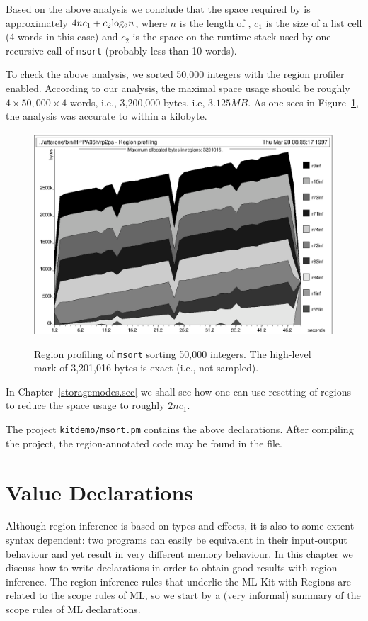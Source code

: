 \documentclass[12pt]{book}
\begin{document}
Based on the above analysis we conclude that the space required by
 is approximately $4nc_1+c_2{\rm log}_2n$, where $n$ is 
the length of , $c_1$ is the size of a list cell (4 words in this
case) and $c_2$ is the space on the runtime stack used by one recursive call
of {\tt msort} (probably less than 10 words). 

To check the above analysis, we sorted 50,000 integers with the region profiler
enabled. According to our
analysis, the maximal space usage should be roughly $4\times 50,000 \times 4$
words, i.e., 3,200,000 bytes, i.e,  $3.125MB$. 
As one sees in  Figure~\ref{msort.fig}, the analysis was accurate to within a
kilobyte. 

\begin{figure}[t]
\vbox{
\hskip-1cm{{\includegraphics{msort.ps}}}
}
\caption{Region profiling of {\tt msort} sorting 50,000
integers. The high-level mark of 3,201,016 bytes is exact (i.e., not sampled).}
\label{msort.fig}
\end{figure}

In Chapter~\ref{storagemodes.sec} we shall see how one can use resetting of
regions to reduce the space usage to roughly $2nc_1$.

The project {\tt kitdemo/msort.pm} contains the above declarations. 
After compiling the project, the region-annotated code may be found
in the file.
%
\chapter{Value Declarations}
%
\label{valdecl.sec}
Although region inference is based on types and effects, it is also
to some extent syntax dependent: two programs can easily be equivalent
in their input-output behaviour and yet result in very different memory
behaviour. In this chapter we discuss how to write 
declarations in order
to obtain good results with region inference. The region inference rules
that underlie the ML Kit with Regions are related to the scope rules of
ML, so we start by a (very informal) summary of the scope rules of ML declarations.
\end{document}
